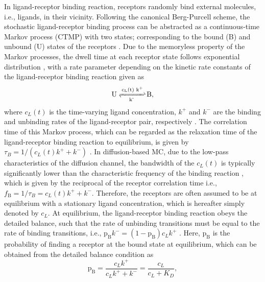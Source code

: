 \documentclass[twocolumn]{IEEEtran}
\newcommand{\p}{\mathrm{p}}
\newcommand{\B}{\mathrm{B}}
\begin{document}
In ligand-receptor binding reaction, receptors randomly bind external molecules, i.e., ligands, in their vicinity. Following the canonical Berg-Purcell scheme, the stochastic ligand-receptor binding process can be abstracted as a continuous-time Markov process (CTMP) with two states; corresponding to the bound (B) and unbound (U) states of the receptors \cite{berg1977physics, ten2016fundamental}. Due to the memoryless property of the Markov processes, the dwell time at each receptor state follows exponential distribution \cite{liggett2010continuous}, with a rate parameter depending on the kinetic rate constants of the ligand-receptor binding reaction given as    
\begin{equation}
\ce{U  <=>[{c_L(t) k^+}][{k^-}] B},
\label{eq:bindingreaction}
\end{equation}
where $c_L(t)$ is the time-varying ligand concentration, $k^+$ and $k^-$ are the binding and unbinding rates of the ligand-receptor pair, respectively \cite{berezhkovskii2013effect}. The correlation time of this Markov process, which can be regarded as the relaxation time of the ligand-receptor binding reaction to equilibrium, is given by $\tau_B = 1/\left(c_L(t) k^+ + k^-\right)$ \cite{berezhkovskii2013effect, ten2016fundamental}. In diffusion-based MC, due to the low-pass characteristics of the diffusion channel, the bandwidth of the $c_L(t)$ is typically significantly lower than the characteristic frequency of the binding reaction \cite{pierobon2011noise}, which is given by the reciprocal of the receptor correlation time i.e., $f_\text{B} = 1/\tau_B = c_L(t) k^+ + k^-$. Therefore, the receptors are often assumed to be at equilibrium with a stationary ligand concentration, which is hereafter simply denoted by $c_L$. At equilibrium, the ligand-receptor binding reaction obeys the detailed balance, such that the rate of unbinding transitions must be equal to the rate of binding transitions, i.e., $\p_\B k^- = (1-\p_\B) c_L k^+$ \cite{endres2009maximum}. Here, $\p_\B$ is the probability of finding a receptor at the bound state at equilibrium, which can be obtained from the detailed balance condition as 
\begin{equation}
	\p_\B  = \frac{c_L k^+}{c_L k^+ + k^-} = \frac{c_L}{c_L+K_D},
	\end{equation}
\end{document}
